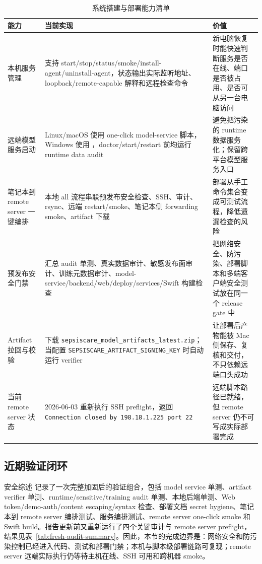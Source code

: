 \documentclass[11pt,a4paper]{article}
\begin{document}
\begin{table}[H]
\centering
\caption{系统搭建与部署能力清单}
\label{tab:deployment-capabilities}
\scriptsize
\setlength{\tabcolsep}{3pt}
\renewcommand{\arraystretch}{1.14}
\begin{tabularx}{\textwidth}{@{}l Y Y@{}}
\toprule
能力 & 当前实现 & 价值\\
\midrule
本机服务管理 &  支持 start/stop/status/smoke/install-agent/uninstall-agent，状态输出实际监听地址、loopback/remote-capable 解释和远程检查命令 & 新电脑恢复时能快速判断服务是否在线、端口是否被占用、是否可从另一台电脑访问\\
远端模型服务启动 & Linux/macOS 使用 one-click model-service 脚本，Windows 使用 ，doctor/start/restart 前均运行 runtime data audit & 避免把污染的 runtime 数据服务化；保留跨平台模型服务入口\\
笔记本到 remote server 一键编排 & 本地 all 流程串联预发布安全检查、SSH、审计、rsync、远端 restart/smoke、笔记本侧 forwarding smoke、artifact 下载 & 部署从手工命令集合变成可测试流程，降低遗漏检查的风险\\
预发布安全门禁 &  汇总 audit 单测、真实数据审计、敏感发布面审计、训练元数据审计、model-service/backend/web/deploy/services/Swift 构建检查 & 把网络安全、防污染、部署脚本和多端客户端安全测试放在同一个 release gate 中\\
Artifact 拉回与校验 &  下载 \texttt{sepsiscare\_model\_artifacts\_latest.zip}；当配置 \texttt{SEPSISCARE\_ARTIFACT\_SIGNING\_KEY} 时自动运行 verifier & 让部署后产物能被 Mac 侧保存、复核和交付，不只依赖远端口头成功\\
当前 remote server 状态 & 2026-06-03 重新执行 SSH preflight，返回 \texttt{Connection closed by 198.18.1.225 port 22} & 远端脚本路径已就绪，但 remote server 仍不可写成实际部署完成\\
\bottomrule
\end{tabularx}
\end{table}

\subsection{近期验证闭环}
安全综述  记录了一次完整加固后的验证组合，包括 model service 单测、artifact verifier 单测、runtime/sensitive/training audit 单测、本地后端单测、Web token/demo-auth/content escaping/syntax 检查、部署文档 secret hygiene、笔记本到 remote server 编排测试、服务编排测试、remote server one-click smoke 和 Swift build。报告更新前又重新运行了四个关键审计与 remote server preflight，结果见表~\ref{tab:fresh-audit-summary}。因此，本节的完成边界是：网络安全和防污染控制已经进入代码、测试和部署门禁；本机与脚本级部署链路可复现；remote server 远端实际执行仍等待主机在线、SSH 可用和跨机器 smoke。
\end{document}
